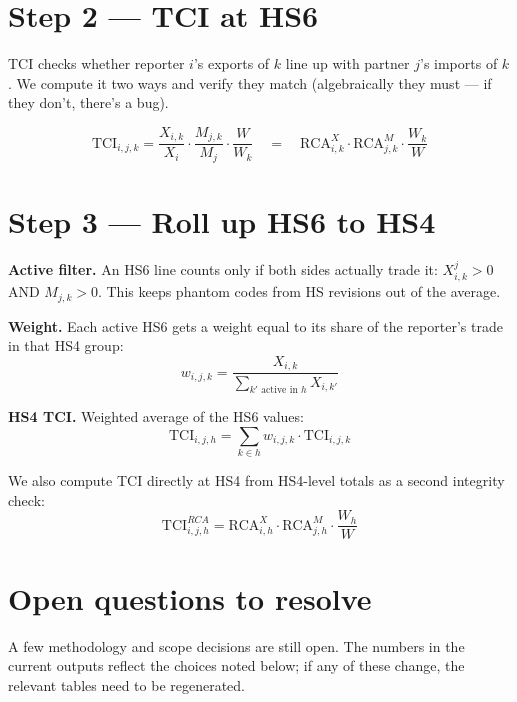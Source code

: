 \documentclass[11pt,a4paper]{article}
\begin{document}
\section*{Step 2 --- TCI at HS6}
TCI checks whether reporter $i$'s exports of $k$ line up with partner $j$'s imports of $k$. We compute it two ways and verify they match (algebraically they must --- if they don't, there's a bug).

\begin{equation*}
\mathrm{TCI}_{i,j,k} = \frac{X_{i,k}}{X_{i}} \cdot \frac{M_{j,k}}{M_{j}} \cdot \frac{W}{W_{k}}
\quad = \quad
\mathrm{RCA}^{X}_{i,k} \cdot \mathrm{RCA}^{M}_{j,k} \cdot \frac{W_{k}}{W}
\end{equation*}

\section*{Step 3 --- Roll up HS6 to HS4}

\textbf{Active filter.} An HS6 line counts only if both sides actually trade it: $X_{i,k}^{j} > 0$ AND $M_{j,k} > 0$. This keeps phantom codes from HS revisions out of the average.

\textbf{Weight.} Each active HS6 gets a weight equal to its share of the reporter's trade in that HS4 group:
\begin{equation*}
w_{i,j,k} = \frac{X_{i,k}}{\sum_{k' \text{ active in } h} X_{i,k'}}
\end{equation*}

\textbf{HS4 TCI.} Weighted average of the HS6 values:
\begin{equation*}
\mathrm{TCI}_{i,j,h} = \sum_{k \in h} w_{i,j,k} \cdot \mathrm{TCI}_{i,j,k}
\end{equation*}

We also compute TCI directly at HS4 from HS4-level totals as a second integrity check:
\begin{equation*}
\mathrm{TCI}^{RCA}_{i,j,h} = \mathrm{RCA}^{X}_{i,h} \cdot \mathrm{RCA}^{M}_{j,h} \cdot \frac{W_{h}}{W}
\end{equation*}

\section*{Open questions to resolve}
A few methodology and scope decisions are still open. The numbers in the current outputs reflect the choices noted below; if any of these change, the relevant tables need to be regenerated.
\end{document}
